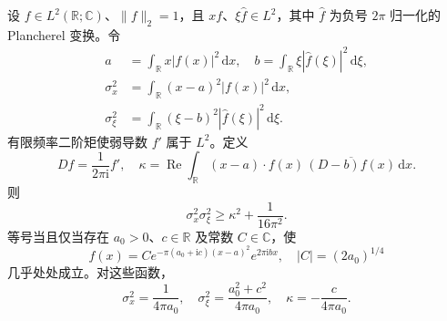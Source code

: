 \begin{proposition}[含相关项的不确定性不等式]\label{b2:prop:20-correlated-uncertainty}
设 \(f\in L^2(\mathbb R;\mathbb C)\)、\(\|f\|_2=1\)，且 \(xf\)、\(\xi\widehat f\in L^2\)，其中 \(\widehat f\) 为负号 \(2\pi\) 归一化的 Plancherel 变换。令
\[
 \begin{aligned}
 a&=\int_{\mathbb R}x|f(x)|^2\,\mathrm dx,
 \quad
 b=\int_{\mathbb R}\xi|\widehat f(\xi)|^2\,\mathrm d\xi,\\
 \sigma_x^2&=\int_{\mathbb R}(x-a)^2|f(x)|^2\,\mathrm dx,\\
 \sigma_\xi^2&=\int_{\mathbb R}(\xi-b)^2
                    |\widehat f(\xi)|^2\,\mathrm d\xi.
 \end{aligned}
\]
有限频率二阶矩使弱导数 \(f'\) 属于 \(L^2\)。定义
\[
 Df=\frac1{2\pi\mathrm i}f',
 \quad
 \kappa=\operatorname{Re}\int_{\mathbb R}
       (x-a)\cdot f(x)\,\overline{(D-b)f(x)}\,\mathrm dx.
\]
则
\[
 \sigma_x^2\sigma_\xi^2
 \geq\kappa^2+\frac1{16\pi^2}.
\]
等号当且仅当存在 \(a_0>0\)、\(c\in\mathbb R\) 及常数 \(C\in\mathbb C\)，使
\[
 f(x)=C e^{-\pi(a_0+\mathrm ic)(x-a)^2}
           e^{2\pi\mathrm i bx},
 \quad
 |C|=(2a_0)^{1/4}
\]
几乎处处成立。对这些函数，
\[
 \sigma_x^2=\frac1{4\pi a_0},
 \quad
 \sigma_\xi^2=\frac{a_0^2+c^2}{4\pi a_0},
 \quad
 \kappa=-\frac{c}{4\pi a_0}.
\]
\end{proposition}
